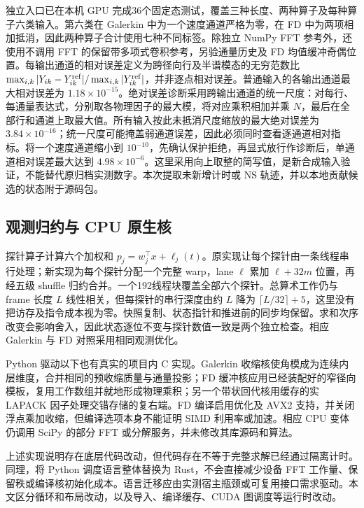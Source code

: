 独立入口已在本机 GPU 完成36个固定态测试，覆盖三种长度、两种算子及每种算子六类输入。第六类在 Galerkin 中为一个速度通道严格为零，在 FD 中为两项相加抵消，因此两种算子合计使用七种不同标签。除独立 NumPy FFT 参考外，还使用不调用 FFT 的保留带多项式卷积参考，另验通量历史及 FD 均值缓冲奇偶位置。每输出通道的相对误差定义为跨径向行及半谱模态的无穷范数比 \(\max_{i,k}|Y_{ik}-Y^{\rm ref}_{ik}|/\max_{i,k}|Y^{\rm ref}_{ik}|\)，并非逐点相对误差。普通输入的各输出通道最大相对误差为 \(1.18\times10^{-15}\)。绝对误差诊断采用跨输出通道的统一尺度：对每行、每通量表达式，分别取各物理因子的最大模，将对应乘积相加并乘 \(N\)，最后在全部行和通道上取最大值。所有输入按此未抵消尺度缩放的最大绝对误差为 \(3.84\times10^{-16}\)；统一尺度可能掩盖弱通道误差，因此必须同时查看逐通道相对指标。将一个速度通道缩小到 \(10^{-10}\)，先确认保护拒绝，再显式放行作诊断后，单通道相对误差最大达到 \(4.98\times10^{-6}\)。这里采用向上取整的简写值，是新合成输入验证，不能替代原归档实测数字。本次提取未新增计时或 NS 轨迹，并以本地贡献候选的状态附于源码包。

\subsection{观测归约与 CPU 原生核}

探针算子计算六个加权和 \(p_j=w_j^\top x+\ell_j(t)\)。原实现让每个探针由一条线程串行处理；新实现为每个探针分配一个完整 warp，lane \(\ell\) 累加 \(\ell+32m\) 位置，再经五级 shuffle 归约合并\cite{r18}。一个192线程块覆盖全部六个探针。总算术工作仍与 frame 长度 \(L\) 线性相关，但每探针的串行深度由约 \(L\) 降为 \(\lceil L/32\rceil+5\)，这里没有把访存及指令成本视为零。快照复制、状态指针和推进前的同步均保留。求和次序改变会影响舍入，因此状态逐位不变与探针数值一致是两个独立检查。相应 Galerkin 与 FD 对照采用相同观测优化。

Python 驱动以下也有真实的项目内 C 实现。Galerkin 收缩核使角模成为连续内层维度，合并相同的预收缩质量与通量投影；FD 缓冲核应用已经装配好的窄径向模板，复用工作数组并就地形成物理乘积；另一个带状回代核用缓存的实 LAPACK 因子处理交错存储的复右端。FD 编译启用优化及 AVX2 支持，并关闭浮点乘加收缩，但编译选项本身不能证明 SIMD 利用率或加速。相应 CPU 变体仍调用 SciPy 的部分 FFT 或分解服务，并未修改其库源码和算法。

上述实现说明存在底层代码改动，但代码存在不等于完整求解已经通过隔离计时。同理，将 Python 调度语言整体替换为 Rust，不会直接减少设备 FFT 工作量、保留秩或编译核初始化成本。语言迁移应由实测宿主瓶颈或可复用接口需求驱动。本文区分循环和布局改动，以及导入、编译缓存、CUDA 图调度等运行时改动。

